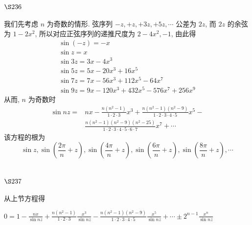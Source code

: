 \section{$\S 236$}

我们先考虑 $n$ 为奇数的情形. 弦序列 $-z,+z,+3 z,+5 z, \cdots$ 公差为 $2 z$, 而 $2 z$ 的余弦 为 $1-2 x^{2}$, 所以对应正弦序列的递推尺度为 $2-4 x^{2},-1$, 由此得
\[
\begin{gathered}
\sin (-z)=-x \\
\sin z=x \\
\sin 3 z=3 x-4 x^{3} \\
\sin 5 z=5 x-20 x^{3}+16 x^{5} \\
\sin 7 z=7 x-56 x^{3}+112 x^{5}-64 x^{7} \\
\sin 9 z=9 x-120 x^{3}+432 x^{5}-576 x^{7}+256 x^{9}
\end{gathered}
\]
从而, $n$ 为奇数时
\[
\begin{aligned}
\sin n z= & n x-\frac{n\left(n^{2}-1\right)}{1 \cdot 2 \cdot 3} x^{3}+\frac{n\left(n^{2}-1\right)\left(n^{2}-9\right)}{1 \cdot 2 \cdot 3 \cdot 4 \cdot 5} x^{5}- \\
& \frac{n\left(n^{2}-1\right)\left(n^{2}-9\right)\left(n^{2}-25\right)}{1 \cdot 2 \cdot 3 \cdot 4 \cdot 5 \cdot 6 \cdot 7} x^{7}+\cdots
\end{aligned}
\]
该方程的根为
\[
\sin z, \sin \left(\frac{2 \pi}{n}+z\right), \sin \left(\frac{4 \pi}{n}+z\right), \sin \left(\frac{6 \pi}{n}+z\right), \sin \left(\frac{8 \pi}{n}+z\right), \cdots
\]
\section{$\S 237$}

从上节方程得

$0=1-\frac{n x}{\sin n z}+\frac{n\left(n^{2}-1\right)}{1 \cdot 2 \cdot 3} \frac{x^{3}}{\sin n z}-\frac{n\left(n^{2}-1\right)\left(n^{2}-9\right)}{1 \cdot 2 \cdot 3 \cdot 4 \cdot 5} \frac{x^{5}}{\sin n z}+\cdots \pm 2^{n-1} \frac{x^{n}}{\sin n z}$


